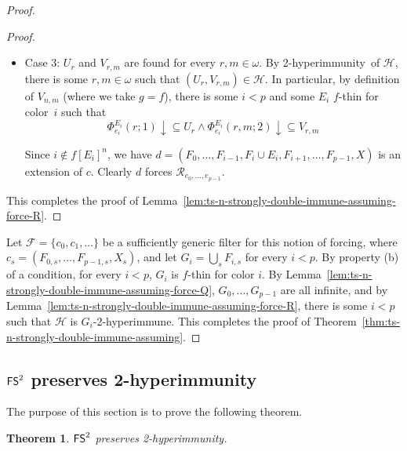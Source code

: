 \documentclass{amsart}
\newtheorem{theorem}{Theorem}[section]
\theoremstyle{definition}
\theoremstyle{remark}
\numberwithin{equation}{section}
\theoremstyle{noparens}
\def\propertyL{2-hyperimmunity}
\def\hyper{2-hyperimmune}
\newcommand{\Fcal}{\mathcal{F}}
\newcommand{\Hcal}{\mathcal{H}}
\newcommand{\Rcal}{\mathcal{R}}
\newcommand{\s}[1]{\ensuremath{\sf{#1}}}
\DeclareMathOperator{\fs}{\s{FS}}
\begin{document}
\begin{proof}
\begin{proof}
\begin{itemize}
It remains to show that $d$ forces $\Phi_{e_i}^{G_i}(n,m;2)\uparrow$.
This is because if $G_i$ satisfies $(E,  Y)$, then $G_i$ is $g$-thin  for color $i$.
But $\Phi_{e_i}^{ E}(r;1) \downarrow \subseteq U_r$.
 Thus, by definition of $g$
 (namely (\ref{fsts-tsnstrongpreserve-defofg})),
  $\Phi_{e_i}^{G_i}(r,m;2) \uparrow$.

	\bigskip

	\item Case 3: $U_r$ and $V_{r,m}$ are found for every $r,m \in \omega$.
	By  \propertyL\ of $\Hcal$, there is some $r, m \in \omega$
	such that $(U_r, V_{r,m}) \in \Hcal$.
	In particular, by definition of $V_{n,m}$ (where we take $g=f$),
	there is some $i < p$ and some $E_i $ $f$-thin for color~$i$ such that
	$$
	\Phi_{e_i}^{  E_i }(r;1) \downarrow \subseteq U_r
		\wedge \Phi_{e_i}^{E_i }(r, m;2) \downarrow \subseteq V_{r,m}
	$$
	
Since $i\notin f[E_i]^n$,
we have $d = (F_0, \dots, F_{i-1}, F_i \cup E_i, F_{i+1}, \dots, F_{p-1}, X)$ is an extension of $c$.
Clearly  $d$ forces $\Rcal_{e_0, \dots, e_{p-1}}$.
\end{itemize}
This completes the proof of Lemma~\ref{lem:ts-n-strongly-double-immune-assuming-force-R}.
\end{proof}

Let $\Fcal = \{c_0, c_1, \dots \}$ be a sufficiently generic filter for this notion of forcing,
where $c_s = (F_{0,s}, \dots, F_{p-1,s}, X_s)$, and let $G_i = \bigcup_s F_{i,s}$ for every $i < p$.
By property (b) of a condition, for every $i < p$, $G_i$ is $f$-thin for color $i$.
By Lemma~\ref{lem:ts-n-strongly-double-immune-assuming-force-Q}, $G_0, \dots, G_{p-1}$ are all infinite,
and by Lemma~\ref{lem:ts-n-strongly-double-immune-assuming-force-R}, there is some $i < p$ such that
$\Hcal$ is $  G_i$-\hyper.
This completes the proof of Theorem~\ref{thm:ts-n-strongly-double-immune-assuming}.
\end{proof}

\subsection{$\fs^2$ preserves \propertyL}\label{subsect:fs2-preserves}

The purpose of this section is to prove the following theorem.

\begin{theorem}\label{thm:ts-1-strongly-preserves-double}
$\fs^2$ preserves \propertyL.
\end{theorem}
\end{document}
